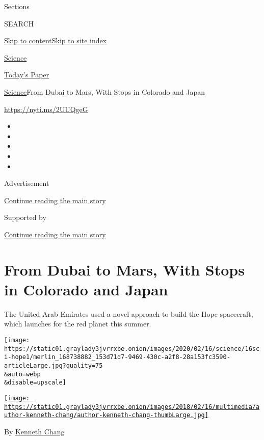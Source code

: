 Sections

SEARCH

\protect\hyperlink{site-content}{Skip to
content}\protect\hyperlink{site-index}{Skip to site index}

\href{https://www.nytimes3xbfgragh.onion/section/science}{Science}

\href{https://myaccount.nytimes3xbfgragh.onion/auth/login?response_type=cookie\&client_id=vi}{}

\href{https://www.nytimes3xbfgragh.onion/section/todayspaper}{Today's
Paper}

\href{/section/science}{Science}\textbar{}From Dubai to Mars, With Stops
in Colorado and Japan

\url{https://nyti.ms/2UUQgeG}

\begin{itemize}
\item
\item
\item
\item
\item
\end{itemize}

Advertisement

\protect\hyperlink{after-top}{Continue reading the main story}

Supported by

\protect\hyperlink{after-sponsor}{Continue reading the main story}

\hypertarget{from-dubai-to-mars-with-stops-in-colorado-and-japan}{%
\section{From Dubai to Mars, With Stops in Colorado and
Japan}\label{from-dubai-to-mars-with-stops-in-colorado-and-japan}}

The United Arab Emirates used a novel approach to build the Hope
spacecraft, which launches for the red planet this summer.

\texttt{[image: https://static01.graylady3jvrrxbe.onion/images/2020/02/16/science/16sci-hope1/merlin\_168738882\_153d71d7-9469-430c-a2f8-28a153fc3590-articleLarge.jpg?quality=75\\\&auto=webp\\\&disable=upscale]}

\href{https://www.nytimes3xbfgragh.onion/by/kenneth-chang}{\texttt{[image: https://static01.graylady3jvrrxbe.onion/images/2018/02/16/multimedia/author-kenneth-chang/author-kenneth-chang-thumbLarge.jpg]}}

By \href{https://www.nytimes3xbfgragh.onion/by/kenneth-chang}{Kenneth
Chang}

